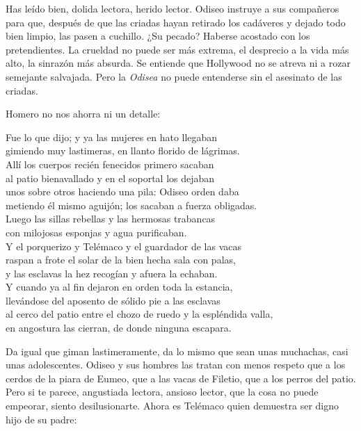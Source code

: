 Has leído bien, dolida lectora, herido lector. Odiseo instruye a sus compañeros para que, después de que las criadas hayan retirado los cadáveres y dejado todo bien limpio, las pasen a cuchillo. ¿Su pecado? Haberse acostado con los pretendientes. La crueldad no puede ser más extrema, el desprecio a la vida más alto, la sinrazón más absurda. Se entiende que Hollywood no se atreva ni a rozar semejante salvajada. Pero la \emph{Odisea} no puede entenderse sin el asesinato de las criadas.

Homero no nos ahorra ni un detalle:

\begin{versocita}
Fue lo que dijo; y ya las mujeres en hato llegaban\\
gimiendo muy lastimeras, en llanto florido de lágrimas.\\
Allí los cuerpos recién fenecidos primero sacaban\\
al patio bienavallado y en el soportal los dejaban\\
unos sobre otros haciendo una pila: Odiseo orden daba\\
metiendo él mismo aguijón; los sacaban a fuerza obligadas.\\
Luego las sillas rebellas y las hermosas trabancas\\
con milojosas esponjas y agua purificaban.\\
Y el porquerizo y Telémaco y el guardador de las vacas\\
raspan a frote el solar de la bien hecha sala con palas,\\
y las esclavas la hez recogían y afuera la echaban.\\
Y cuando ya al fin dejaron en orden toda la estancia,\\
llevándose del aposento de sólido pie a las esclavas\\
al cerco del patio entre el chozo de ruedo y la espléndida valla,\\
en angostura las cierran, de donde ninguna escapara.
\end{versocita}

Da igual que giman lastimeramente, da lo mismo que sean unas muchachas, casi unas adolescentes. Odiseo y sus hombres las tratan con menos respeto que a los cerdos de la piara de Eumeo, que a las vacas de Filetio, que a los perros del patio. Pero si te parece, angustiada lectora, ansioso lector, que la cosa no puede empeorar, siento desilusionarte. Ahora es Telémaco quien demuestra ser digno hijo de su padre:

